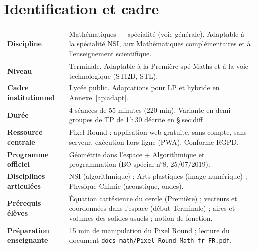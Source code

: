 \documentclass[12pt,a4paper]{scrartcl}
\begin{document}
\renewcommand{\contentsname}{\color{accent}Sommaire}
\tableofcontents
\thispagestyle{fancy}
\newpage

\section{Identification et cadre}

\begin{center}
\begin{tabular}{@{}p{}p{}@{}}
\toprule
\textbf{Discipline} & Mathématiques --- spécialité (voie générale). Adaptable à la spécialité NSI, aux Mathématiques complémentaires et à l'enseignement scientifique. \\
\addlinespace[2pt]
\textbf{Niveau} & Terminale. Adaptable à la Première spé Maths et à la voie technologique (STI2D, STL). \\
\addlinespace[2pt]
\textbf{Cadre institutionnel} & Lycée public. Adaptations pour LP et hybride en Annexe~\ref{ap:adapt}. \\
\addlinespace[2pt]
\textbf{Durée} & 4 séances de 55 minutes (220 min). Variante en demi-groupes de TP de 1\,h\,30 décrite en §\ref{sec:diff}. \\
\addlinespace[2pt]
\textbf{Ressource centrale} & Pixel Round : application web gratuite, sans compte, sans serveur, exécution hors-ligne (PWA). Conforme RGPD. \\
\addlinespace[2pt]
\textbf{Programme officiel} & Géométrie dans l'espace + Algorithmique et programmation (BO spécial n°8, 25/07/2019). \\
\addlinespace[2pt]
\textbf{Disciplines articulées} & NSI (algorithmique) ; Arts plastiques (image numérique) ; Physique-Chimie (acoustique, ondes). \\
\addlinespace[2pt]
\textbf{Prérequis élèves} & Équation cartésienne du cercle (Première) ; vecteurs et coordonnées dans l'espace (début Terminale) ; aires et volumes des solides usuels ; notion de fonction. \\
\addlinespace[2pt]
\textbf{Préparation enseignante} & 15 min de manipulation du Pixel Round ; lecture du document \texttt{docs\_math/Pixel\_Round\_Math\_fr-FR.pdf}. \\
\bottomrule
\end{tabular}
\end{center}
\end{document}
